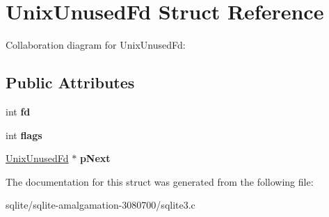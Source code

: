 \hypertarget{struct_unix_unused_fd}{\section{Unix\+Unused\+Fd Struct Reference}
\label{struct_unix_unused_fd}
}


Collaboration diagram for Unix\+Unused\+Fd\+:
\subsection*{Public Attributes}
\begin{DoxyCompactItemize}
\item 
\hypertarget{struct_unix_unused_fd_a3f1a6127218af971aeb7b131c9c1600d}{int {\bfseries fd}}\label{struct_unix_unused_fd_a3f1a6127218af971aeb7b131c9c1600d}

\item 
\hypertarget{struct_unix_unused_fd_a744cd118bd91ec2019108e8205708684}{int {\bfseries flags}}\label{struct_unix_unused_fd_a744cd118bd91ec2019108e8205708684}

\item 
\hypertarget{struct_unix_unused_fd_a6bbcba75beeabdd2df126638bc1d8bc0}{\hyperlink{struct_unix_unused_fd}{Unix\+Unused\+Fd} $\ast$ {\bfseries p\+Next}}\label{struct_unix_unused_fd_a6bbcba75beeabdd2df126638bc1d8bc0}

\end{DoxyCompactItemize}


The documentation for this struct was generated from the following file\+:\begin{DoxyCompactItemize}
\item 
sqlite/sqlite-\/amalgamation-\/3080700/sqlite3.\+c\end{DoxyCompactItemize}
